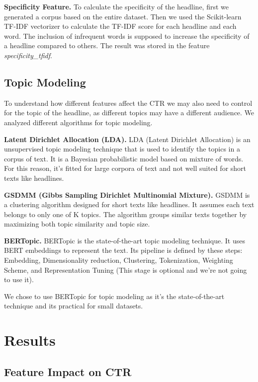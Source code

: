\documentclass[11pt]{article}
\begin{document}
\textbf{Specificity Feature.} To calculate the specificity of the headline, first we generated a corpus based on the entire dataset. Then we used the Scikit-learn TF-IDF vectorizer to calculate the TF-IDF score for each headline and each word. The inclusion of infrequent words is supposed to increase the specificity of a headline compared to others. The result was stored in the feature \textit{specificity\_tfidf}.

\subsection{Topic Modeling}

To understand how different features affect the CTR we may also need to control for the topic of the headline, as different topics may have a different audience. We analyzed different algorithms for topic modeling.

\textbf{Latent Dirichlet Allocation (LDA).} LDA (Latent Dirichlet Allocation) is an unsupervised topic modeling technique that is used to identify the topics in a corpus of text. It is a Bayesian probabilistic model based on mixture of words. For this reason, it's fitted for large corpora of text and not well suited for short texts like headlines.

\textbf{GSDMM (Gibbs Sampling Dirichlet Multinomial Mixture).} GSDMM is a clustering algorithm designed for short texts like headlines. It assumes each text belongs to only one of K topics. The algorithm groups similar texts together by maximizing both topic similarity and topic size.

\textbf{BERTopic.} BERTopic is the state-of-the-art topic modeling technique. It uses BERT embeddings to represent the text. Its pipeline is defined by these steps: Embedding, Dimensionality reduction, Clustering, Tokenization, Weighting Scheme, and Representation Tuning (This stage is optional and we're not going to use it).

We chose to use BERTopic for topic modeling as it's the state-of-the-art technique and its practical for small datasets.

\section{Results}

\subsection{Feature Impact on CTR}
\end{document}
